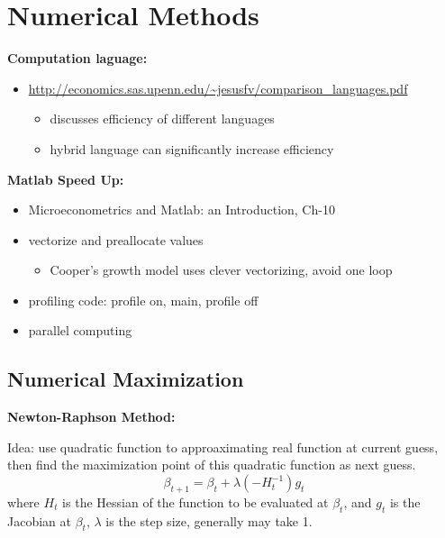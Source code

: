 \documentclass{book}
\theoremstyle{plain}
\theoremstyle{definition}
\begin{document}






\chapter{Numerical Methods} %
\label{cha:numerical_methods}


\noindent
\textbf{Computation laguage:}
\begin{itemize}
	\item \url{http://economics.sas.upenn.edu/~jesusfv/comparison_languages.pdf}
	\begin{itemize}
		\item discusses efficiency of different languages
		\item hybrid language can significantly increase efficiency
	\end{itemize}
\end{itemize}

\noindent
\textbf{Matlab Speed Up:}
\begin{itemize}
	\item Microeconometrics and Matlab: an Introduction, Ch-10
	\item vectorize and preallocate values
		\begin{itemize}
		 	\item Cooper's growth model uses clever vectorizing, avoid one loop
		 \end{itemize} 
	\item profiling code: profile on, main, profile off
	\item parallel computing
\end{itemize}

\section{Numerical Maximization} %
\label{sec:numerical_maximization}

\noindent
\textbf{Newton-Raphson Method:}

Idea: use quadratic function to approaximating real function at current guess,
then find the maximization point of this quadratic function as next guess.
\[\beta_{t+1}=\beta_t + \lambda(-H^{-1}_t)g_t\]
where $H_t$ is the Hessian of the function to be evaluated at $\beta_t$, 
and $g_t$ is the Jacobian at $\beta_t$,
$\lambda$ is the step size, generally may take 1.
\end{document}
